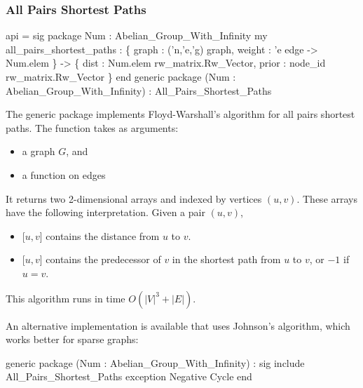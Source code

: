 \subsubsection{All Pairs Shortest Paths}
\begin{SML}
 api  = sig 
   package Num : Abelian_Group_With_Infinity
   my all_pairs_shortest_paths :
                 \{ graph : ('n,'e,'g) graph,
                   weight : 'e edge -> Num.elem
                 \} ->
                 \{ dist : Num.elem rw_matrix.Rw_Vector,
                   prior :  node_id rw_matrix.Rw_Vector
                 \}
 end
 generic package (Num : Abelian_Group_With_Infinity) 
    : All_Pairs_Shortest_Paths
\end{SML}
The generic package  implements Floyd-Warshall's algorithm
for all pairs shortest paths.  The function 
 takes as arguments: 
\begin{itemize}
\item a graph $G$, and
\item a  function on edges
\end{itemize}
It returns two 2-dimensional arrays  and 
indexed by vertices $(u,v)$.  These arrays have the following
interpretation.  Given a pair $(u,v)$,
\begin{itemize}
\item {}[$u,v$] contains the distance from $u$ to $v$.
\item {}[$u,v$] contains the predecessor of $v$ in the shortest
path from $u$ to $v$, or $-1$ if $u=v$.
\end{itemize}
This algorithm runs in time $O(|V|^3+|E|)$.

An alternative implementation is available that uses Johnson's algorithm, 
which works better for sparse graphs:
\begin{SML}
 generic package (Num : Abelian_Group_With_Infinity) 
    : sig include All_Pairs_Shortest_Paths
          exception Negative Cycle
      end
\end{SML}

